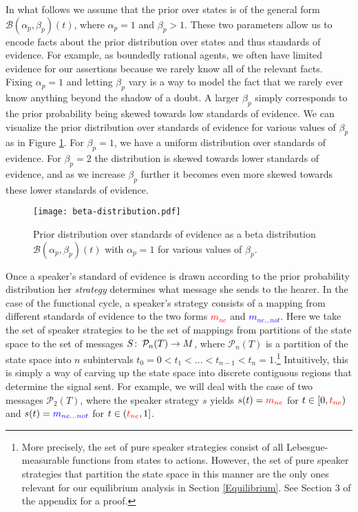 \documentclass[linguex]{sp}
\theoremstyle{definition} \newtheorem{definition}{Definition}
\begin{document}
In what follows we assume that the prior over states is of the general form $\mathcal{B}(\alpha_p,\beta_p)(t)$, where $\alpha_p = 1$ and $\beta_p > 1$. These two parameters allow us to encode facts about the prior distribution over states and thus standards of evidence. For example, as boundedly rational agents, we often have limited evidence for our assertions because we rarely know all of the relevant facts. Fixing $\alpha_p=1$ and letting $\beta_p$ vary is a way to model the fact that we rarely ever know anything beyond the shadow of a doubt.  A larger $\beta_p$ simply corresponds to the prior probability being skewed towards low standards of evidence.  We can visualize the prior distribution over standards of evidence for various values of $\beta_p$ as in Figure \ref{beta}. For $\beta_p = 1$, we have a uniform distribution over standards of evidence. For $\beta_p = 2$ the distribution is skewed towards lower standards of evidence, and as we increase $\beta_p$ further it becomes even more skewed towards these lower standards of evidence. 

\begin{figure}
\begin{center}
	\texttt{[image: beta-distribution.pdf]}
	\caption{Prior distribution over standards of evidence as a beta distribution $\mathcal{B}(\alpha_p, \beta_p)(t)$  with $\alpha_p = 1$ for various values of $\beta_p$.}
	\label{beta}
\end{center}
\end{figure}

Once a speaker's standard of evidence is drawn according to the prior probability distribution her \emph{strategy} determines what message she sends to the hearer. In the case of the functional cycle, a speaker's strategy consists of a mapping from different standards of evidence to the two forms \emph{\textcolor{red}{$m_{ne}$}} and \emph{\textcolor{blue}{$m_{ne...not}$}}.  Here we take the set of speaker strategies to be the set of mappings from partitions of the state space to the set of messages $S \colon\thinspace \mathcal{P}_n(T) \rightarrow M$, where $\mathcal{P}_n(T)$ is a partition of the state space into $n$ subintervals $t_0 = 0 < t_1 < ... < t_{n-1} < t_n = 1$.\footnote{More precisely, the set of pure speaker strategies consist of all Lebesgue-measurable functions from states to actions. However, the set of pure speaker strategies that partition the state space in this manner are the only ones relevant for our equilibrium analysis in Section \ref{Equilibrium}. See Section 3 of the appendix for a proof.}  Intuitively, this is simply a way of carving up the state space into discrete contiguous regions that determine the signal sent.  For example, we will deal with the case of two messages $\mathcal{P}_2(T)$, where the speaker  strategy $s$ yields $s(t) = \textcolor{red}{m_{ne}}$ for $t \in [0, \emph{\textcolor{red}{$t_{ne}$}})$ and $s(t) = \textcolor{blue}{m_{ne...not}}$  for $t \in (\emph{\textcolor{red}{$t_{ne}$}}, 1]$.  
\end{document}

